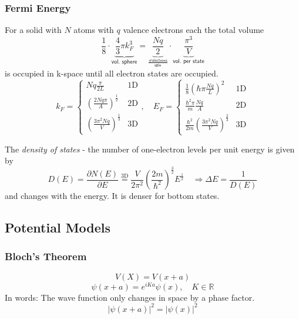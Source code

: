 \subsubsection{Fermi Energy}
For a solid with $N$ atoms with $q$ valence electrons each the total volume
\noindent\begin{equation*}
    \frac{1}{8}\cdot\underbrace{\frac{4}{3}\pi k_F^3}_{\textsf{vol. sphere}} = \underbrace{\frac{Nq}{2}}_{\frac{\textsf{\# electrons}}{\mathsf{spin}}}\cdot \underbrace{\frac{\pi^3}{V}}_{\textsf{vol. per state}}
\end{equation*}
is occupied in k-space until all electron states are occupied.
\noindent\begin{equation*}
    k_F  = \begin{cases}
        Nq\frac{\pi}{2L}                                  & \mathrm{1D} \\
        {\left(\frac{2Nq\pi}{A}\right)}^\frac{1}{2}       & \mathrm{2D} \\
        {\left(\frac{3\pi^2 N q}{V}\right)}^{\frac{1}{3}} & \mathrm{3D}
    \end{cases}, \quad
    E_F  = \begin{cases}
        \frac{1}{8}\left(\hbar \pi \frac{Nq}{L}\right)^2                    & \mathrm{1D} \\
        \frac{\hbar^2 \pi}{m} \frac{Nq}{A}                                  & \mathrm{2D} \\
        \frac{\hbar^2}{2m}{\left(\frac{3\pi^2 N q}{V}\right)}^{\frac{2}{3}} & \mathrm{3D}
    \end{cases}
\end{equation*}

\newpar{}

The \textit{density of states} - the number of one-electron levels per unit energy is given by
\noindent\begin{equation*}
    D(E)=\frac{\partial N(E)}{\partial E} \overset{\mathrm{3D}}{=} \frac{V}{2\pi^2}{\left(\frac{2m}{\hbar^2}\right)}^{\frac{3}{2}} E^{\frac{1}{2}} \quad \Rightarrow \Delta E = \frac{1}{D(E)}
\end{equation*}
and changes with the energy. It is denser for bottom states.

\subsection{Potential Models}
\subsubsection{Bloch's Theorem}
\noindent\begin{equation*}
    V(X) = V(x+a)
\end{equation*}
\noindent\begin{equation*}
    \psi(x+a) = e^{iKa} \psi(x), \quad K\in \mathbb{R}
\end{equation*}
In words: The wave function only changes in space by a phase factor.
\noindent\begin{equation*}
    {|\psi(x+a)|}^2={|\psi(x)|}^2
\end{equation*}

